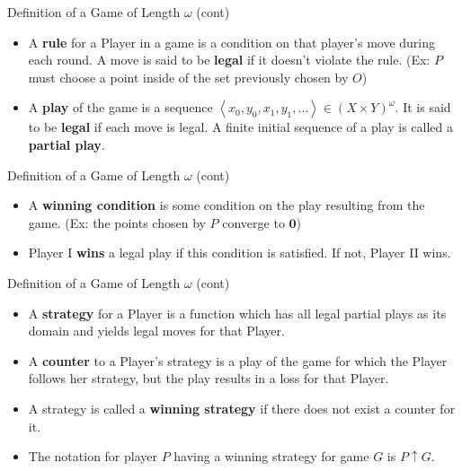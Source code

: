 \documentclass{beamer}
\newcommand{\win}{\uparrow}
\renewcommand{\vec}[1]{\mathbf{#1}}
\begin{document}
\begin{frame}{Definition of a Game of Length $\omega$ (cont)}
\begin{itemize}
\item A \textbf{rule} for a Player in a game is a condition on that player's move during each round. A move is said to be \textbf{legal} if it doesn't violate the rule. (Ex: $P$ must choose a point inside of the set previously chosen by $O$)
\pause
\item A \textbf{play} of the game is a sequence $\left<x_0,y_0,x_1,y_1,\dots\right> \in (X\times Y)^\omega$. It is said to be \textbf{legal} if each move is legal. A finite initial sequence of a play is called a \textbf{partial play}.
\end{itemize}
\end{frame}

\begin{frame}{Definition of a Game of Length $\omega$ (cont)}
\begin{itemize}
\item A \textbf{winning condition} is some condition on the play resulting from the game. (Ex: the points chosen by $P$ converge to $\vec{0}$)
\pause
\item Player I \textbf{wins} a legal play if this condition is satisfied. If not, Player II wins.
\end{itemize}
\end{frame}

\begin{frame}{Definition of a Game of Length $\omega$ (cont)}
\begin{itemize}
\item A \textbf{strategy} for a Player is a function which has all legal partial plays as its domain and yields legal moves for that Player.
\pause
\item A \textbf{counter} to a Player's strategy is a play of the game for which the Player follows her strategy, but the play results in a loss for that Player.
\pause
\item A strategy is called a \textbf{winning strategy} if there does not exist a counter for it.
\pause
\item The notation for player $P$ having a winning strategy for game $G$ is $P\win G$.
\end{itemize}
\end{frame}
\end{document}
